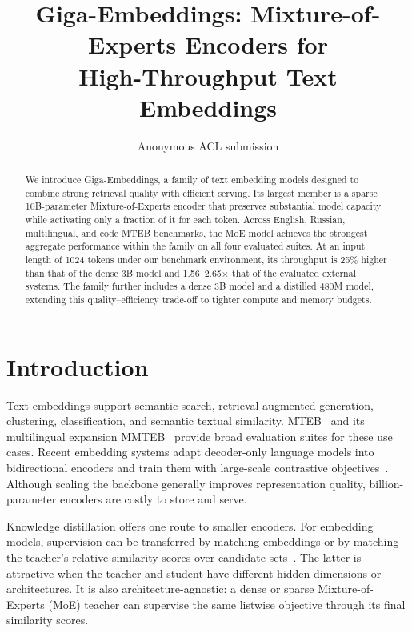 \documentclass[11pt]{article}
\title{Giga-Embeddings: Mixture-of-Experts Encoders for\\High-Throughput Text Embeddings}
\author{Anonymous ACL submission}
\begin{document}
\maketitle

\begin{abstract}
We introduce Giga-Embeddings, a family of text embedding models designed to combine strong retrieval quality with efficient serving.
Its largest member is a sparse 10B-parameter Mixture-of-Experts encoder that preserves substantial model capacity while activating only a fraction of it for each token.
Across English, Russian, multilingual, and code MTEB benchmarks, the MoE model achieves the strongest aggregate performance within the family on all four evaluated suites.
At an input length of 1024 tokens under our benchmark environment, its throughput is 25\% higher than that of the dense 3B model and 1.56--2.65$\times$ that of the evaluated external systems.
The family further includes a dense 3B model and a distilled 480M model, extending this quality--efficiency trade-off to tighter compute and memory budgets.
\end{abstract}

\section{Introduction}
\label{sec:introduction}

Text embeddings support semantic search, retrieval-augmented generation, clustering, classification, and semantic textual similarity.
MTEB~\citep{muennighoff2023mteb} and its multilingual expansion MMTEB~\citep{enevoldsen2025mmteb} provide broad evaluation suites for these use cases.
Recent embedding systems adapt decoder-only language models into bidirectional encoders and train them with large-scale contrastive objectives~\citep{behnamghader2024llm2vec,wang2024improving,lee2025nvembed,kolodin2025gigaembeddings}.
Although scaling the backbone generally improves representation quality, billion-parameter encoders are costly to store and serve.

Knowledge distillation offers one route to smaller encoders.
For embedding models, supervision can be transferred by matching embeddings or by matching the teacher's relative similarity scores over candidate sets~\citep{reimers2020multilingual,xu2023distillcse,zhao2026kalm}.
The latter is attractive when the teacher and student have different hidden dimensions or architectures.
It is also architecture-agnostic: a dense or sparse Mixture-of-Experts (MoE) teacher can supervise the same listwise objective through its final similarity scores.
\end{document}
